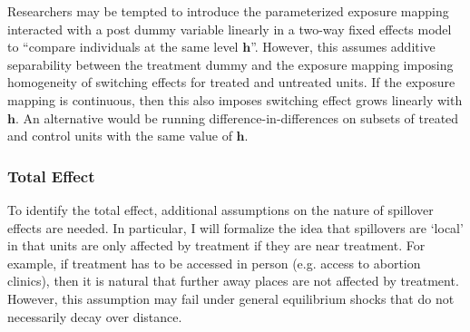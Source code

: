 

\begin{remark}
  Researchers may be tempted to introduce the parameterized exposure mapping interacted with a post dummy variable linearly in a two-way fixed effects model to ``compare individuals at the same level $\bm{h}$''. However, this assumes additive separability between the treatment dummy and the exposure mapping imposing homogeneity of switching effects for treated and untreated units. If the exposure mapping is continuous, then this also imposes switching effect grows linearly with $\bm{h}$. An alternative would be running difference-in-differences on subsets of treated and control units with the same value of $\bm{h}$. 
\end{remark}

\subsubsection{Total Effect}

To identify the total effect, additional assumptions on the nature of spillover effects are needed. In particular, I will formalize the idea that spillovers are `local' in that units are only affected by treatment if they are near treatment. For example, if treatment has to be accessed in person (e.g. access to abortion clinics), then it is natural that further away places are not affected by treatment. However, this assumption may fail under general equilibrium shocks that do not necessarily decay over distance. 

